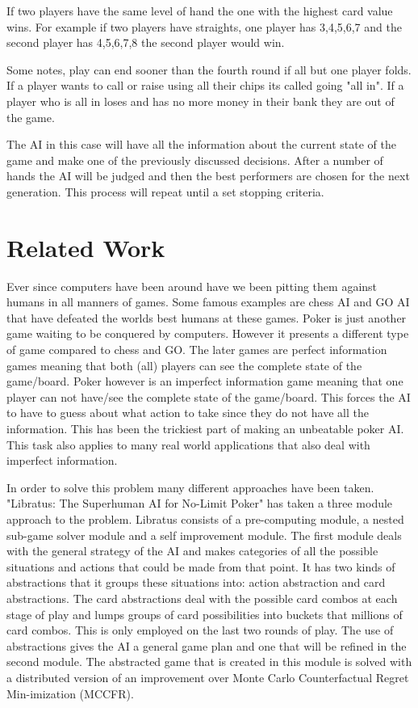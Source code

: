 If two players have the same level of hand the one with the highest card value wins. For example if two players have straights, one player has 3,4,5,6,7 and the second player has 4,5,6,7,8 the second player would win.

Some notes, play can end sooner than the fourth round if all but one player folds. If a player wants to call or raise using all their chips its called going "all in". If a player who is all in loses and has no more money in their bank they are out of the game.

The AI in this case will have all the information about the current state of the game and make one of the previously discussed decisions. After a number of hands the AI will be judged and then the best performers are chosen for the next generation. This process will repeat until a set stopping criteria.


\section{Related Work}
Ever since computers have been around have we been pitting them against humans in all manners of games. Some famous examples are chess AI and GO AI that have defeated the worlds best humans at these games\cite{brown2017libratus}\cite{gilpin2005optimal}\cite{doi:10.1126/science.aay2400}. Poker is just another game waiting to be conquered by computers. However it presents a different type of game compared to chess and GO. The later games are perfect information games meaning that both (all) players can see the complete state of the game/board. Poker however is an imperfect information game meaning that one player can not have/see the complete state of the game/board\cite{brown2017libratus}\cite{davidson2000improved}\cite{gilpin2005optimal}\cite{gilpin2006competitive}\cite{doi:10.1126/science.aay2400}. This forces the AI to have to guess about what action to take since they do not have all the information. This has been the trickiest part of making an unbeatable poker AI. This task also applies to many real world applications that also deal with imperfect information.

In order to solve this problem many different approaches have been taken. "Libratus: The Superhuman AI for No-Limit Poker" has taken a three module approach to the problem\cite{brown2017libratus}. Libratus consists of a pre-computing module, a nested sub-game solver module and a self improvement module. The first module deals with the general strategy of the AI and makes categories of all the possible situations and actions that could be made from that point. It has two kinds of abstractions that it groups these situations into: action abstraction and card abstractions\cite{brown2017libratus}. The card abstractions deal with the possible card combos at each stage of play and lumps groups of card possibilities into buckets that millions of card combos. This is only employed on the last two rounds of play\cite{brown2017libratus}. The use of abstractions gives the AI a general game plan and one that will be refined in the second module. The abstracted game that is created in this module is solved with a distributed version of an improvement over Monte Carlo Counterfactual Regret Min-imization (MCCFR)\cite{brown2017libratus}.

